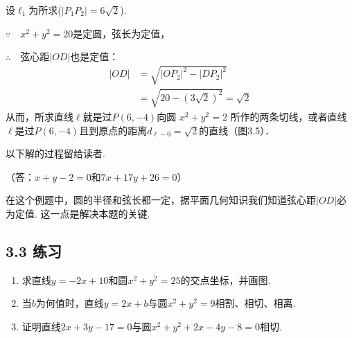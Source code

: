 \begin{analyze}
    设$\ell_1$为所求($|P_1P_2|=6\sqrt{2}$).

\noindent
\begin{minipage}{.52\textwidth}\CTEXindent
$\because\quad    x^2+y^2=20$是定圆，弦长为定值，

$\therefore\quad $弦心距$|OD|$也是定值：
\[\begin{split}
    |OD|&=\sqrt{|OP_2|^2-|DP_2|^2}\\
    &=\sqrt{20-\left(3\sqrt{2}\right)^2}=\sqrt{2}
\end{split}\]
从而，所求直线$\ell$就是过$P(6,-4)$向圆
$x^2+y^2=2$
所作的两条切线，或者直线$\ell$是过$P(6,-4)$且到原点的距离$d_{\ell-0}=\sqrt{2}$的直线（图3.5）．

以下解的过程留给读者.
\end{minipage}
\hfill
\begin{minipage}{.45\textwidth}
\centering
{}
\end{minipage}

（答：$x+y-2=0$和$7x+17y+26=0$）
\end{analyze}

\begin{remark}
 在这个例题中，圆的半径和弦长都一定，据平面几何知识我们知道弦心距$|OD|$必为定值. 这一点是解决本题的关键.
\end{remark}


\subsection*{3.3 练习}
\begin{enumerate}
    \item 求直线$y=-2x+10$和圆$x^2+y^2=25$的交点坐标，并画图.
    \item 当$b$为何值时，直线$y=2x+b$与圆$x^2+y^2=9$相割、相切、相离.
    \item 证明直线$2x+3y-17=0$与圆$x^2+y^2+2x-4y-8=0$相切.
\end{enumerate}

